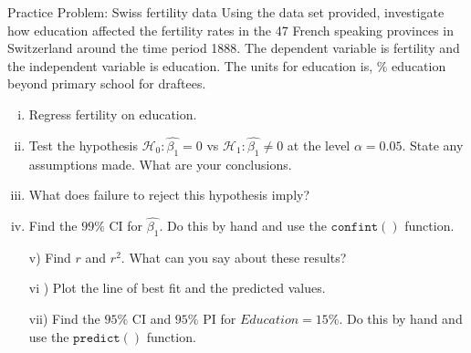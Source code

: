 \documentclass{beamer}
\begin{document}
	\begin{frame}{Practice Problem: Swiss fertility data}
		Using the data set provided, investigate how education affected the fertility rates in the 47 French speaking provinces in Switzerland around the time period 1888. The dependent variable is fertility and the independent variable is education. The units for education is, $\%$ education beyond primary school for draftees.
		\begin{enumerate}[i)]
			\item Regress fertility on education.
			\item Test the hypothesis $\mathcal{H}_0:\hat{\beta_1}=0$ vs $\mathcal{H}_1:\hat{\beta_1}\neq 0$ at the level $\alpha=0.05$. State any assumptions made. What are your conclusions.
			\item What does failure to reject this hypothesis imply?
			\item Find the $99\%$ CI for $\hat{\beta_1}$. Do this by hand and use the $\mathtt{confint()}$ function.
		\end{enumerate}
	\end{frame}
	\begin{frame}
		\begin{enumerate}
			\item[v)] Find $r$ and $r^2$. What can you say about these results?
			\item[vi]) Plot the line of best fit and the predicted values.
			\item[vii)] Find the $95\%$ CI and $95\%$ PI for $Education=15\%$. Do this by hand and use the $\mathtt{predict()}$ function.
		\end{enumerate}
	\end{frame}
\end{document}
